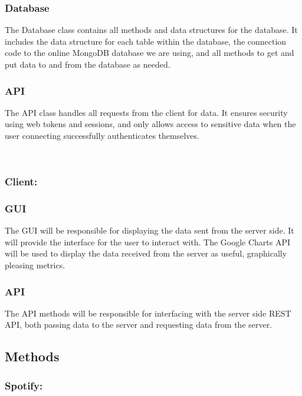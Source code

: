 \documentclass[11pt]{report}
\begin{document}
\subsubsection{Database}
The Database class contains all methods and data structures for the database. It includes the data structure for each table within the database, the connection code to the online MongoDB database we are using, and all methods to get and put data to and from the database as needed.

\subsubsection{API}
The API class handles all requests from the client for data. It ensures security using web tokens and sessions, and only allows access to sensitive data when the user connecting successfully authenticates themselves.  


\leavevmode \\

\subsubsection{Client:}

\hrulefill

\subsubsection{GUI}
The GUI will be responsible for displaying the data sent from the server side. It will provide the interface for the user to interact with. The Google Charts API will be used to display the data received from the server as useful, graphically pleasing metrics.

\subsubsection{API}
The API methods will be responsible for interfacing with the server side REST API, both passing data to the server and requesting data from the server.

\subsection{Methods}

\subsubsection{Spotify:}
\end{document}
